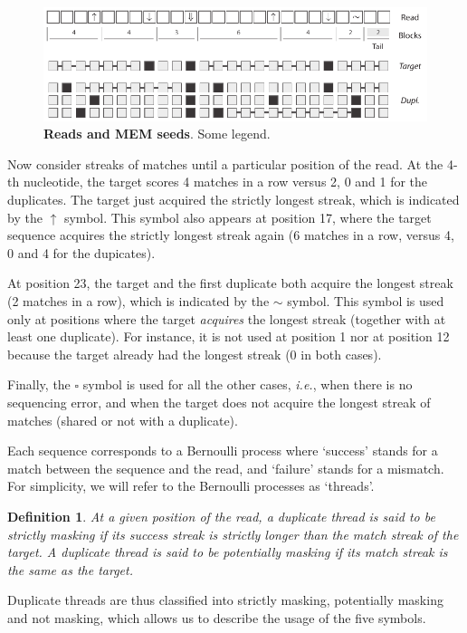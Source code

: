 \documentclass{article}
\newtheorem{definition}{Definition}
\begin{document}
\begin{figure}[h]
\centering
\includegraphics[scale=.9]{sketch_MEM.pdf}
\caption{\textbf{Reads and MEM seeds}. 
Some legend.}
\label{fig:sketch_MEM}
\end{figure}

Now consider streaks of matches until a particular position of the read.
At the 4-th nucleotide, the target scores 4 matches in a row versus 2, 0
and 1 for the duplicates. The target just acquired the strictly longest
streak, which is indicated by the $\uparrow$ symbol. This symbol also
appears at position 17, where the target sequence acquires the strictly
longest streak again (6 matches in a row, versus 4, 0 and 4 for the
dupicates).

At position 23, the target and the first duplicate both acquire the
longest streak (2 matches in a row), which is indicated by the $\sim$
symbol. This symbol is used only at positions where the target
\emph{acquires} the longest streak (together with at least one duplicate).
For instance, it is not used at position 1 nor at position 12 because the
target already had the longest streak (0 in both cases).

Finally, the $\square$ symbol is used for all the other cases,
\textit{i.e.}, when there is no sequencing error, and when the target does
not acquire the longest streak of matches (shared or not with a
duplicate).

Each sequence corresponds to a Bernoulli process where `success' stands
for a match between the sequence and the read, and `failure' stands for a
mismatch. For simplicity, we will refer to the Bernoulli processes as
`threads'.

\begin{definition}
At a given position of the read, a duplicate thread is said to be
\emph{strictly masking} if its success streak is strictly longer than the
match streak of the target. A duplicate thread is said to be
\emph{potentially masking} if its match streak is the same as the target.
\end{definition}

Duplicate threads are thus classified into strictly masking, potentially
masking and not masking, which allows us to describe the usage of the five
symbols.
\end{document}
